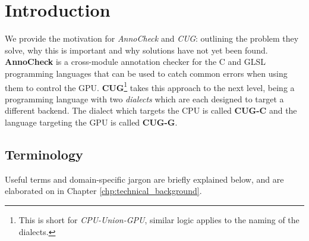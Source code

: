 \documentclass[a4paper,12pt,twoside,openright]{report}
\begin{document}
\pagestyle{empty}
\singlespacing

\onehalfspacing

\singlespacing

\singlespacing


\setcounter{page}{0}
\pagestyle{plain}
\tableofcontents

\onehalfspacing


\chapter{Introduction}
\setcounter{page}{1}

\label{sec:TODO}

We provide the motivation for \textit{AnnoCheck} and \textit{CUG}: outlining
the problem they solve, why this is important and why solutions have not yet
been found. \textbf{AnnoCheck} is a cross-module annotation checker for the C
and GLSL programming languages that can be used to catch common errors when
using them to control the GPU. \textbf{CUG}\footnote{This is short for
\textit{CPU-Union-GPU}, similar logic applies to the naming of the dialects.}
takes this approach to the next level, being a programming language with two
\textit{dialects} which are each designed to target a different backend. The
dialect which targets the CPU is called \textbf{CUG-C} and the language
targeting the GPU is called \textbf{CUG-G}.

\section{Terminology}


Useful terms and domain-specific jargon are briefly explained below, and are
elaborated on in Chapter \ref{chp:technical_background}.
\end{document}
